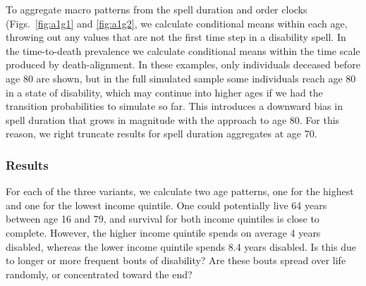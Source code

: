 \documentclass{article}
\begin{document}
To aggregate macro patterns from the spell duration and order clocks (Figs.~\ref{fig:a1g1} and \ref{fig:a1g2}, we calculate conditional means within each age, throwing out any values that are not the first time step in a disability spell. In the time-to-death prevalence we calculate conditional means within the time scale produced by death-alignment. In these examples, only individuals deceased before age 80 are shown, but in the full simulated sample some individuals reach age 80 in a state of disability, which may continue into higher ages if we had the transition probabilities to simulate so far. This introduces a downward bias in spell duration that grows in magnitude with the approach to age 80. For this reason, we right truncate results for spell duration aggregates at age 70. 

\FloatBarrier

\subsubsection{Results}
For each of the three variants, we calculate two age patterns, one for the highest and one for the lowest income quintile. One could potentially live 64 years between age 16 and 79, and survival for both income quintiles is close to complete. However, the higher income quintile spends on average 4 years disabled, whereas the lower income quintile spends 8.4 years disabled. Is this due to longer or more frequent bouts of disability? Are these bouts spread over life randomly, or concentrated toward the end?
\end{document}
